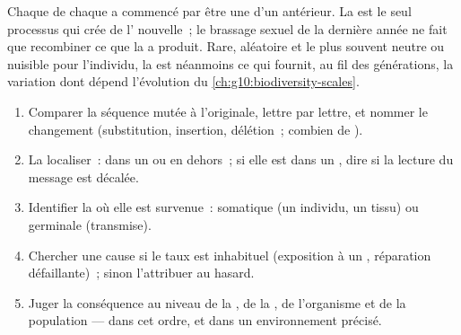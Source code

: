 \begin{proposition}\label{prop:g11:mutations:source}
Chaque  de chaque  a commencé par être une  d'un
 antérieur. La  est le seul processus qui crée de
l' nouvelle~; le brassage sexuel de la dernière
année ne fait que recombiner ce que la  a produit. Rare,
aléatoire et le plus souvent neutre ou nuisible pour l'individu, la
 est néanmoins ce qui fournit, au fil des générations, la
variation dont dépend l'évolution du
\cref{ch:g10:biodiversity-scales}.
\end{proposition}
\admitted

\begin{method}\label{met:g11:mutations:analyse}
\begin{enumerate}
  \item Comparer la séquence mutée à l'originale, lettre par lettre, et
        nommer le changement (substitution, insertion, délétion~;
        combien de ).
  \item La localiser~: dans un  ou en dehors~; si elle est dans un
        , dire si la lecture du message est décalée.
  \item Identifier la  où elle est survenue~: somatique (un
        individu, un tissu) ou germinale (transmise).
  \item Chercher une cause si le taux est inhabituel (exposition à un
        , réparation défaillante)~; sinon l'attribuer au
        hasard.
  \item Juger la conséquence au niveau de la , de la ,
        de l'organisme et de la population --- dans cet ordre, et dans
        un environnement précisé.
\end{enumerate}
\end{method}

